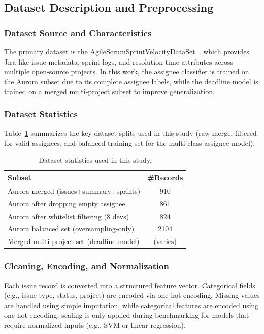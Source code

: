 \documentclass[conference]{IEEEtran}
\begin{document}
\subsection{Dataset Description and Preprocessing}

\subsubsection{Dataset Source and Characteristics}
The primary dataset is the AgileScrumSprintVelocityDataSet~\cite{koralage2023_velocity}, which provides Jira like issue metadata, sprint logs, and resolution-time attributes across multiple open-source projects. In this work, the assignee classifier is trained on the Aurora subset due to its complete assignee labels, while the deadline model is trained on a merged multi-project subset to improve generalization.

\subsubsection{Dataset Statistics}
Table~\ref{tab:dataset_stats} summarizes the key dataset splits used in this study (raw merge, filtered for valid assignees, and balanced training set for the multi-class assignee model).

\begin{table}[t]
\centering
\caption{Dataset statistics used in this study.}
\renewcommand{\arraystretch}{1.15}
\begin{tabular}{l c}
\hline
\textbf{Subset} & \textbf{\#Records} \\
\hline
Aurora merged (issues+summary+sprints) & 910 \\
Aurora after dropping empty assignee & 861 \\
Aurora after whitelist filtering (8 devs) & 824 \\
Aurora balanced set (oversampling-only) & 2104 \\
Merged multi-project set (deadline model) & (varies) \\
\hline
\end{tabular}
\label{tab:dataset_stats}
\end{table}

\subsubsection{Cleaning, Encoding, and Normalization}
Each issue record is converted into a structured feature vector. Categorical fields (e.g., issue type, status, project) are encoded via one-hot encoding. Missing values are handled using simple imputation, while categorical features are encoded using one-hot encoding; scaling is only applied during benchmarking for models that require normalized inputs (e.g., SVM or linear regression).
\end{document}
